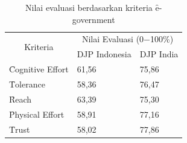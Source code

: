 \begin{table}
	\centering
	\caption{Nilai evaluasi berdasarkan kriteria \f{e-government}}
	\label{tab:kriteriaegov}
	\begin{tabular}{|l|l|l|}
			\hline
			\multicolumn{1}{|c|}{\multirow{2}{*}{Kriteria}} & \multicolumn{2}{c|}{Nilai Evaluasi (0$-$100\%)} \\ \cline{2-3} 
			& DJP Indonesia                                 & DJP India                                   \\ \hline
			\f{Cognitive Effort}    & 61,56                                   & 75,86                                 \\ \hline
			\f{Tolerance}           & 58,36                                   & 76,47                                  \\ \hline
			\f{Reach}               & 63,39                                   & 75,30                                 \\ \hline
			\f{Physical Effort}     & 58,91                                   & 77,16                                 \\ \hline
			\f{Trust}               & 58,02                                   & 77,86                                 \\ \hline
		\end{tabular}
\end{table}
